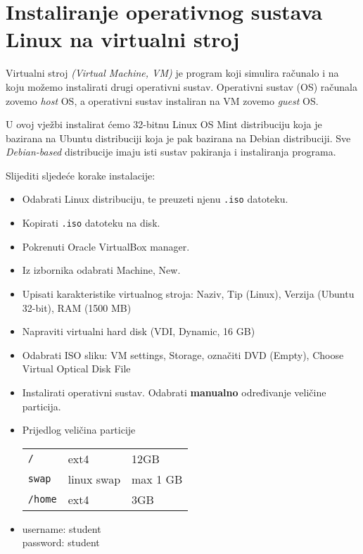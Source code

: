 

\section{Instaliranje operativnog sustava Linux na virtualni stroj}
Virtualni stroj \textit{(Virtual Machine, VM)} je program koji simulira računalo i na koju možemo instalirati drugi operativni sustav. Operativni sustav (OS) računala zovemo \textit{host} OS, a operativni sustav instaliran na VM zovemo \textit{guest} OS.

U ovoj vježbi instalirat ćemo 32-bitnu Linux OS Mint distribuciju koja je bazirana na Ubuntu distribuciji koja je pak bazirana na Debian distribuciji. Sve \textit{Debian-based} distribucije imaju isti sustav pakiranja i instaliranja programa.

\begin{zadatak} Slijediti sljedeće korake instalacije:
\begin{itemize}
\item Odabrati Linux distribuciju, te preuzeti njenu \texttt{.iso} datoteku.
\item Kopirati \texttt{.iso} datoteku na disk.
\item  Pokrenuti Oracle VirtualBox manager.
\item Iz izbornika odabrati Machine, New.
\item Upisati karakteristike virtualnog stroja: Naziv, Tip (Linux), Verzija (Ubuntu 32-bit), RAM (1500 MB)
\item Napraviti virtualni hard disk (VDI, Dynamic, 16 GB)
\item Odabrati ISO sliku: VM settings, Storage, označiti DVD (Empty), Choose Virtual Optical Disk File
\item Instalirati operativni sustav. Odabrati \textbf{manualno} određivanje veličine particija.
    
\item Prijedlog veličina particije 

\begin{tabular}{lll}
 \texttt{/} & ext4 & 12GB \\
 \texttt{swap} & linux swap & max 1 GB\\
 \texttt{/home} & ext4 & 3GB 
 \end{tabular}
\item username: student\\
      password: student
\end{itemize}
\end{zadatak}
 
